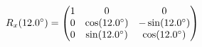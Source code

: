 \documentclass[preview]{standalone}
\begin{document}
\begin{align*}
\special{dvisvgm:raw <g id='unique000'>}R_x(12.0^\circ) = \begin{pmatrix} 1 & 0 & 0 \\ 0 & \cos(12.0^\circ) & -\sin(12.0^\circ) \\ 0 & \sin(12.0^\circ) & \cos(12.0^\circ) \end{pmatrix}\special{dvisvgm:raw </g>}
\end{align*}
\end{document}
